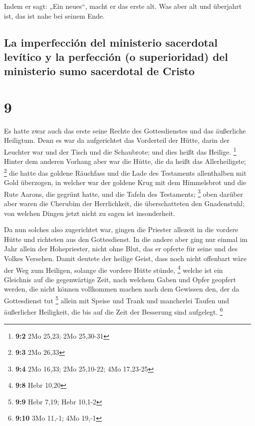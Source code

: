  Indem er sagt: „Ein neues``, macht er das erste alt. Was
aber alt und überjahrt ist, das ist nahe bei seinem Ende.

\hypertarget{la-imperfecciuxf3n-del-ministerio-sacerdotal-levuxedtico-y-la-perfecciuxf3n-o-superioridad-del-ministerio-sumo-sacerdotal-de-cristo}{%
\subsection{La imperfección del ministerio sacerdotal levítico y la
perfección (o superioridad) del ministerio sumo sacerdotal de
Cristo}\label{la-imperfecciuxf3n-del-ministerio-sacerdotal-levuxedtico-y-la-perfecciuxf3n-o-superioridad-del-ministerio-sumo-sacerdotal-de-cristo}}

\hypertarget{section-8}{%
\section{9}\label{section-8}}

 Es hatte zwar auch das erste seine Rechte des
Gottesdienstes und das äußerliche Heiligtum.  Denn es war
da aufgerichtet das Vorderteil der Hütte, darin der Leuchter war und der
Tisch und die Schaubrote; und dies heißt das Heilige. \footnote{\textbf{9:2}
  2Mo 25,23; 2Mo 25,30-31}  Hinter dem anderen Vorhang
aber war die Hütte, die da heißt das Allerheiligste; \footnote{\textbf{9:3}
  2Mo 26,33}  die hatte das goldene Räuchfass und die Lade
des Testaments allenthalben mit Gold überzogen, in welcher war der
goldene Krug mit dem Himmelsbrot und die Rute Aarons, die gegrünt hatte,
und die Tafeln des Testaments; \footnote{\textbf{9:4} 2Mo 16,33; 2Mo
  25,10-22; 4Mo 17,23-25}  oben darüber aber waren die
Cherubim der Herrlichkeit, die überschatteten den Gnadenstuhl; von
welchen Dingen jetzt nicht zu sagen ist insonderheit.

 Da nun solches also zugerichtet war, gingen die Priester
allezeit in die vordere Hütte und richteten aus den Gottesdienst.
 In die andere aber ging nur einmal im Jahr allein der
Hohepriester, nicht ohne Blut, das er opferte für seine und des Volkes
Versehen.  Damit deutete der heilige Geist, dass noch
nicht offenbart wäre der Weg zum Heiligen, solange die vordere Hütte
stünde, \footnote{\textbf{9:8} Hebr 10,20}  welche ist ein
Gleichnis auf die gegenwärtige Zeit, nach welchem Gaben und Opfer
geopfert werden, die nicht können vollkommen machen nach dem Gewissen
den, der da Gottesdienst tut \footnote{\textbf{9:9} Hebr 7,19; Hebr
  10,1-2}  allein mit Speise und Trank und mancherlei
Taufen und äußerlicher Heiligkeit, die bis auf die Zeit der Besserung
sind aufgelegt. \footnote{\textbf{9:10} 3Mo 11,-1; 4Mo 19,-1}

